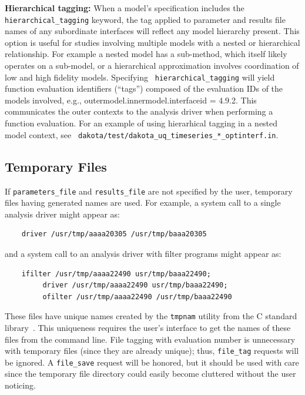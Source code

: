 \textbf{Hierarchical tagging:} When a model's specification includes
the {\tt hierarchical\_tagging} keyword, the tag applied to parameter
and results file names of any subordinate interfaces will reflect any
model hierarchy present.  This option is useful for studies involving
multiple models with a nested or hierarchical relationship.  For
example a nested model has a sub-method, which itself likely operates
on a sub-model, or a hierarchical approximation involves coordination
of low and high fidelity models.  Specifying {\tt
  hierarchical\_tagging} will yield function evaluation identifiers
(``tags'') composed of the evaluation IDs of the models involved,
e.g., outermodel.innermodel.interfaceid = 4.9.2.  This communicates
the outer contexts to the analysis driver when performing a function
evaluation.  For an example of using hierarhical tagging in a nested
model context, see {\tt
  dakota/test/dakota\_uq\_timeseries\_*\_optinterf.in}.

\subsection{Temporary Files}\label{interfaces:file:temporary}

If \texttt{parameters\_file} and \texttt{results\_file} are not
specified by the user, temporary files having generated names are used.
For example, a system call to
a single analysis driver might appear as:
\begin{small}
\begin{verbatim}
    driver /usr/tmp/aaaa20305 /usr/tmp/baaa20305
\end{verbatim}
\end{small}

and a system call to an analysis driver with filter programs might appear as:
\begin{small}
\begin{verbatim}
    ifilter /usr/tmp/aaaa22490 usr/tmp/baaa22490;
         driver /usr/tmp/aaaa22490 usr/tmp/baaa22490;
         ofilter /usr/tmp/aaaa22490 /usr/tmp/baaa22490
\end{verbatim}
\end{small}

These files have unique names created by the \texttt{tmpnam}
utility from the C standard library~\cite{Ker88}. This uniqueness requires
the user's interface to get the names of
these files from the command line. File tagging with evaluation number
is unnecessary with temporary files (since they are already
unique); thus, \texttt{file\_tag} requests will be ignored. A
\texttt{file\_save} request will be honored, but it should be used
with care since the temporary file directory could easily become
cluttered without the user noticing.

